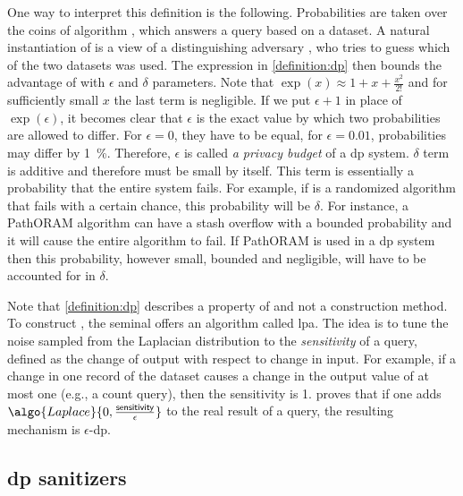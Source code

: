 		One way to interpret this definition is the following.
		Probabilities are taken over the coins of algorithm , which answers a query based on a dataset.
		A natural instantiation of  is a view of a distinguishing adversary \adversary{}, who tries to guess which of the two datasets was used.
		The expression in \cref{definition:dp} then bounds the advantage of \adversary{} with $\epsilon$ and $\delta$ parameters.
		Note that $\exp( x ) \approx 1 + x + \frac{x^2}{2!}$ and for sufficiently small $x$ the last term is negligible.
		If we put $\epsilon + 1$ in place of $\exp( \epsilon )$, it becomes clear that $\epsilon$ is the exact value by which two probabilities are allowed to differ.
		For $\epsilon = 0$, they have to be equal, for $\epsilon = 0.01$, probabilities may differ by \SI{1}{\percent}.
		Therefore, $\epsilon$ is called \emph{a privacy budget} of a \acrshort{dp} system.
		$\delta$ term is additive and therefore must be small by itself.
		This term is essentially a probability that the entire system fails.
		For example, if  is a randomized algorithm that fails with a certain chance, this probability will be $\delta$.
		For instance, a PathORAM \cite{path-oram} algorithm can have a stash overflow with a bounded probability \cite[Theorem 1]{path-oram} and it will cause the entire algorithm to fail.
		If PathORAM is used in a \acrshort{dp} system then this probability, however small, bounded and negligible, will have to be accounted for in $\delta$.

		Note that \cref{definition:dp} describes a property of  and not a construction method.
		To construct , the seminal \cite{differential-privacy-original} offers an algorithm called \acrfull{lpa}.
		The idea is to tune the noise sampled from the Laplacian distribution to the \emph{sensitivity} of a query, defined as the change of output with respect to change in input.
		For example, if a change in one record of the dataset causes a change in the output value of at most one (e.g., a count query), then the sensitivity is 1.
		\cite{differential-privacy-original} proves that if one adds $\algo{Laplace}{0, \frac{\mathsf{sensitivity}}{\epsilon}}$ to the real result of a query, the resulting mechanism is $\epsilon$-\acrshort{dp}.

		\subsection{\texorpdfstring{\acrshort{dp}}{DP} sanitizers}

